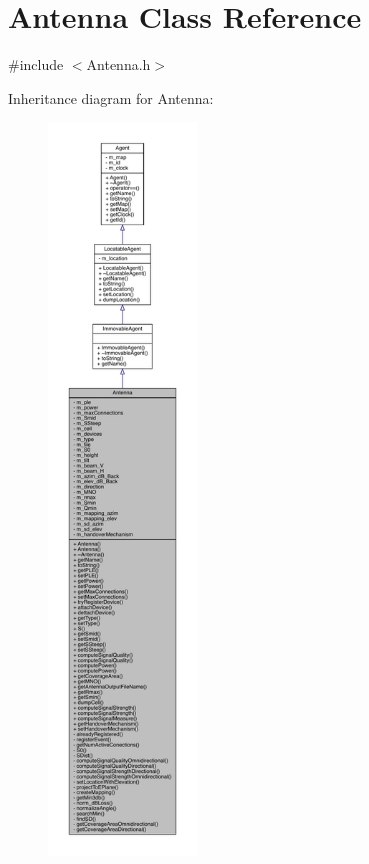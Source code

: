 \hypertarget{class_antenna}{}\section{Antenna Class Reference}
\label{class_antenna}


{\ttfamily \#include $<$Antenna.\+h$>$}



Inheritance diagram for Antenna\+:
\nopagebreak
\begin{figure}[H]
\begin{center}
\leavevmode
\includegraphics[height=550pt]{class_antenna__inherit__graph}
\end{center}
\end{figure}


